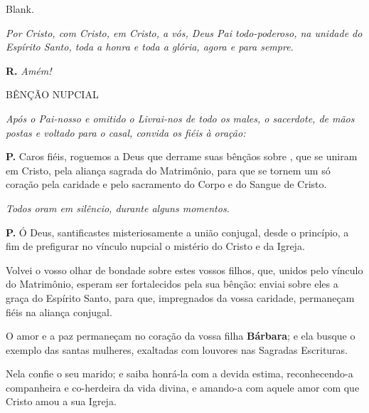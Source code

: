 \documentclass[a5paper,9pt]{memoir}
\begin{document}
{
\begin{paracol}{2}
	{\color{white}Blank.}
	
	\switchcolumn
	
	\itshape
Por Cristo, com Cristo, em Cristo, a vós, Deus Pai todo-poderoso, na unidade do Espírito Santo, toda a honra e toda a glória, agora e para sempre.
\end{paracol}

\textbf{R.} \emph{Amém!}

\begin{center}
BÊNÇÃO NUPCIAL
\end{center}
\vspace{-0.2cm}

{\itshape \color{mygray}Ap\'os o {\color{black}Pai-nosso} e omitido o {\color{black}Livrai-nos de todo os males}, o sacerdote, de m\~aos postas e voltado para o casal, convida os fi\'eis \`a ora\c c\~ao:}


\textbf{P.} Caros fi\'eis, roguemos a Deus que derrame suas b\^en\c c\~aos sobre \BG, que se uniram em Cristo, pela alian\c ca sagrada do Matrim\^onio, para que se tornem um s\'o cora\c c\~ao pela caridade e pelo sacramento do Corpo e do Sangue de Cristo.

{\itshape \color{mygray}Todos oram em silêncio, durante alguns momentos.}

\textbf{P.} \'O Deus, santificastes misteriosamente a uni\~ao conjugal, des\-de o princ\'ipio, a fim de prefigurar no v\'inculo nupcial o mist\'erio do Cristo e da Igreja.

Volvei o vosso olhar de bondade sobre estes vossos filhos, que, unidos pelo v\'inculo do Matrim\^onio, esperam ser fortalecidos pela sua b\^en\c c\~ao: enviai sobre eles a gra\c ca do Esp\'irito Santo, para que, impregnados da vossa caridade, permane\c cam fi\'eis na alian\c ca conjugal.

O amor e a paz permane\c cam no cora\c c\~ao da vossa filha \textbf{B\'arbara}; e ela busque o exemplo das santas mulheres, exaltadas com louvores nas Sagradas Escrituras.

Nela confie o seu marido; e saiba honr\'a-la com a devida estima, reconhecendo-a companheira e co-herdeira da vida divina, e amando-a com aquele amor com que Cristo amou a sua Igreja.

}
\end{document}
